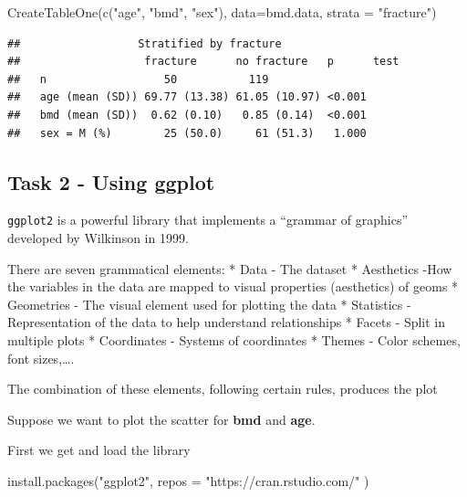 \documentclass[
]{book}
\newenvironment{Shaded}{\begin{snugshade}}{\end{snugshade}}
\newcommand{\AttributeTok}[1]{\textcolor[rgb]{0.77,0.63,0.00}{#1}}
\newcommand{\FunctionTok}[1]{\textcolor[rgb]{0.00,0.00,0.00}{#1}}
\newcommand{\NormalTok}[1]{#1}
\newcommand{\StringTok}[1]{\textcolor[rgb]{0.31,0.60,0.02}{#1}}
\begin{document}
\begin{Shaded}
\begin{Highlighting}[]
\FunctionTok{CreateTableOne}\NormalTok{(}\FunctionTok{c}\NormalTok{(}\StringTok{"age"}\NormalTok{, }\StringTok{"bmd"}\NormalTok{, }\StringTok{"sex"}\NormalTok{), }\AttributeTok{data=}\NormalTok{bmd.data, }\AttributeTok{strata =} \StringTok{"fracture"}\NormalTok{)}
\end{Highlighting}
\end{Shaded}

\begin{verbatim}
##                  Stratified by fracture
##                   fracture      no fracture   p      test
##   n                  50           119                    
##   age (mean (SD)) 69.77 (13.38) 61.05 (10.97) <0.001     
##   bmd (mean (SD))  0.62 (0.10)   0.85 (0.14)  <0.001     
##   sex = M (%)        25 (50.0)     61 (51.3)   1.000
\end{verbatim}

\hypertarget{task-2---using-ggplot}{%
\subsection{Task 2 - Using ggplot}\label{task-2---using-ggplot}}

\texttt{ggplot2} is a powerful library that implements a ``grammar of graphics''
developed by Wilkinson in 1999.

There are seven grammatical elements:
* Data - The dataset
* Aesthetics -How the variables in the data are mapped to visual properties
(aesthetics) of geoms
* Geometries - The visual element used for plotting the data
* Statistics - Representation of the data to help understand relationships
* Facets - Split in multiple plots
* Coordinates - Systems of coordinates
* Themes - Color schemes, font sizes,\ldots.

The combination of these elements, following certain rules, produces the plot

Suppose we want to plot the scatter for \textbf{bmd} and \textbf{age}.

First we get and load the library

\begin{Shaded}
\begin{Highlighting}[]
\FunctionTok{install.packages}\NormalTok{(}\StringTok{"ggplot2"}\NormalTok{,}
                 \AttributeTok{repos =} \StringTok{"https://cran.rstudio.com/"}\NormalTok{ )}
\end{Highlighting}
\end{Shaded}
\end{document}

